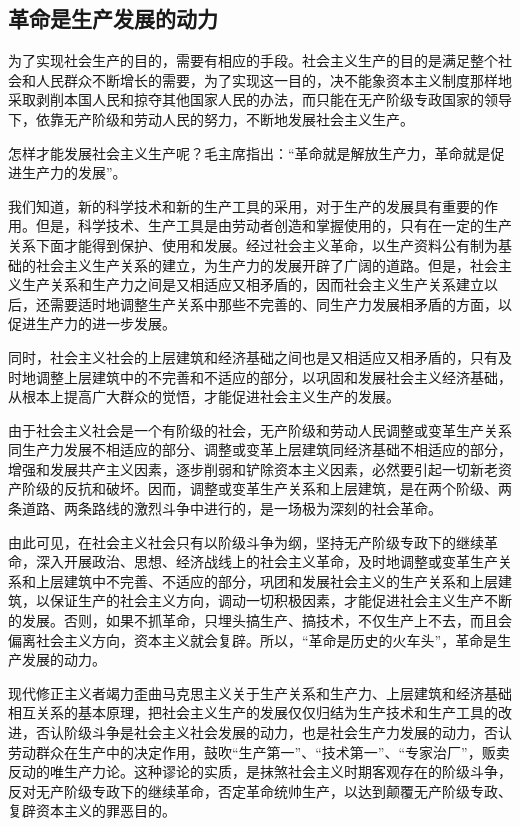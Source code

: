 \documentclass{book}
\begin{document}
\subsection{革命是生产发展的动力}

为了实现社会生产的目的，需要有相应的手段。社会主义生产的目的是满足整个社会和人民群众不断增长的需要，为了实现这一目的，决不能象资本主义制度那样地采取剥削本国人民和掠夺其他国家人民的办法，而只能在无产阶级专政国家的领导下，依靠无产阶级和劳动人民的努力，不断地发展社会主义生产。

怎样才能发展社会主义生产呢？毛主席指出：“革命就是解放生产力，革命就是促进生产力的发展”。

我们知道，新的科学技术和新的生产工具的采用，对于生产的发展具有重要的作用。但是，科学技术、生产工具是由劳动者创造和掌握使用的，只有在一定的生产关系下面才能得到保护、使用和发展。经过社会主义革命，以生产资料公有制为基础的社会主义生产关系的建立，为生产力的发展开辟了广阔的道路。但是，社会主义生产关系和生产力之间是又相适应又相矛盾的，因而社会主义生产关系建立以后，还需要适时地调整生产关系中那些不完善的、同生产力发展相矛盾的方面，以促进生产力的进一步发展。

同时，社会主义社会的上层建筑和经济基础之间也是又相适应又相矛盾的，只有及时地调整上层建筑中的不完善和不适应的部分，以巩固和发展社会主义经济基础，从根本上提高广大群众的觉悟，才能促进社会主义生产的发展。

由于社会主义社会是一个有阶级的社会，无产阶级和劳动人民调整或变革生产关系同生产力发展不相适应的部分、调整或变革上层建筑同经济基础不相适应的部分，增强和发展共产主义因素，逐步削弱和铲除资本主义因素，必然要引起一切新老资产阶级的反抗和破坏。因而，调整或变革生产关系和上层建筑，是在两个阶级、两条道路、两条路线的激烈斗争中进行的，是一场极为深刻的社会革命。

由此可见，在社会主义社会只有以阶级斗争为纲，坚持无产阶级专政下的继续革命，深入开展政治、思想、经济战线上的社会主义革命，及时地调整或变革生产关系和上层建筑中不完善、不适应的部分，巩团和发展社会主义的生产关系和上层建筑，以保证生产的社会主义方向，调动一切积极因素，才能促进社会主义生产不断的发展。否则，如果不抓革命，只埋头搞生产、搞技术，不仅生产上不去，而且会偏离社会主义方向，资本主义就会复辟。所以，“革命是历史的火车头”，革命是生产发展的动力。

现代修正主义者竭力歪曲马克思主义关于生产关系和生产力、上层建筑和经济基础相互关系的基本原理，把社会主义生产的发展仅仅归结为生产技术和生产工具的改进，否认阶级斗争是社会主义社会发展的动力，也是社会生产力发展的动力，否认劳动群众在生产中的决定作用，鼓吹“生产第一”、“技术第一”、“专家治厂”，贩卖反动的唯生产力论。这种谬论的实质，是抹煞社会主义时期客观存在的阶级斗争，反对无产阶级专政下的继续革命，否定革命统帅生产，以达到颠覆无产阶级专政、复辟资本主义的罪恶目的。
\end{document}
